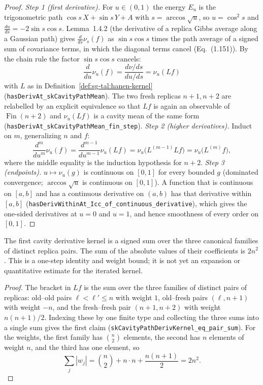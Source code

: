 \begin{proof}
\leanok
\emph{Step 1 (first derivative).} For $u\in(0,1)$ the energy $E_u$ is the trigonometric path $\cos s\,X+\sin s\,Y+A$ with $s=\arccos\sqrt u$, so $u=\cos^2s$ and $\frac{du}{ds}=-2\sin s\cos s$. Lemma~1.4.2 (the derivative of a replica Gibbs average along a Gaussian path) gives $\frac{d}{ds}\nu_s(f)$ as $\sin s\cos s$ times the path average of a signed sum of covariance terms, in which the diagonal terms cancel (Eq.~(1.151)). By the chain rule the factor $\sin s\cos s$ cancels:
\[
\frac d{du}\nu_u(f)=\frac{d\nu/ds}{du/ds}=\nu_u(Lf)
\]
with $L$ as in Definition~\ref{def:sg-tal:hanen-kernel} (\texttt{hasDerivAt\_skCavityPathMean}). The two fresh replicas $n+1,n+2$ are relabelled by an explicit equivalence so that $Lf$ is again an observable of $\operatorname{Fin}(n+2)$ and $\nu_u(Lf)$ is a cavity mean of the same form (\texttt{hasDerivAt\_skCavityPathMean\_fin\_step}).
\emph{Step 2 (higher derivatives).} Induct on $m$, generalizing $n$ and $f$:
\[
\frac{d^m}{du^m}\nu_u(f)=\frac{d^{m-1}}{du^{m-1}}\nu_u(Lf)=\nu_u\big(L^{(m-1)}Lf\big)=\nu_u\big(L^{(m)}f\big),
\]
where the middle equality is the induction hypothesis for $n+2$.
\emph{Step 3 (endpoints).} $u\mapsto\nu_u(g)$ is continuous on $[0,1]$ for every bounded $g$ (dominated convergence; $\arccos\sqrt u$ is continuous on $[0,1]$). A function that is continuous on $[a,b]$ and has a continuous derivative on $(a,b)$ has that derivative within $[a,b]$ (\texttt{hasDerivWithinAt\_Icc\_of\_continuous\_derivative}), which gives the one-sided derivatives at $u=0$ and $u=1$, and hence smoothness of every order on $[0,1]$.
\end{proof}

\begin{lemma}\label{lem:sg-tal:hanen-pair-weights}
\leanok
The first cavity derivative kernel is a signed sum over the three canonical
families of distinct replica pairs. The sum of the absolute values of their
coefficients is $2n^2$. This is a one-step identity and weight bound; it is not
yet an expansion or quantitative estimate for the iterated kernel.
\end{lemma}
\begin{proof}
\leanok
The bracket in $Lf$ is the sum over the three families of distinct pairs of replicas: old--old pairs $\ell<\ell'\le n$ with weight $1$, old--fresh pairs $(\ell,n+1)$
with weight $-n$, and the fresh--fresh pair $(n+1,n+2)$ with weight $n(n+1)/2$. Indexing these by one finite type and collecting the three sums
into a single sum gives the first claim (\texttt{skCavityPathDerivKernel\_eq\_pair\_sum}). For the weights, the first family has $\binom n2$ elements, the second has $n$ elements of weight $n$, and the third has one element, so
\[
\sum_j|w_j|=\binom n2+n\cdot n+\frac{n(n+1)}2=2n^2 .
\]
\end{proof}

